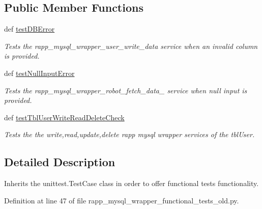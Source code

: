 \subsection*{Public Member Functions}
\begin{DoxyCompactItemize}
\item 
def \hyperlink{classrapp__mysql__wrapper__functional__tests__old_1_1TestDbWrapper_add745ad4016df457ef3687735e06e359}{test\-D\-B\-Error}
\begin{DoxyCompactList}\small\item\em Tests the rapp\-\_\-mysql\-\_\-wrapper\-\_\-user\-\_\-write\-\_\-data service when an invalid column is provided. \end{DoxyCompactList}\item 
def \hyperlink{classrapp__mysql__wrapper__functional__tests__old_1_1TestDbWrapper_a9a405cebcedd692d2ce15f37e6009737}{test\-Null\-Input\-Error}
\begin{DoxyCompactList}\small\item\em Tests the rapp\-\_\-mysql\-\_\-wrapper\-\_\-robot\-\_\-fetch\-\_\-data\-\_\- service when null input is provided. \end{DoxyCompactList}\item 
def \hyperlink{classrapp__mysql__wrapper__functional__tests__old_1_1TestDbWrapper_af9daea9a3c50a0f758f55235f4c26b03}{test\-Tbl\-User\-Write\-Read\-Delete\-Check}
\begin{DoxyCompactList}\small\item\em Tests the the write,read,update,delete rapp mysql wrapper services of the tbl\-User. \end{DoxyCompactList}\end{DoxyCompactItemize}


\subsection{Detailed Description}
Inherits the unittest.\-Test\-Case class in order to offer functional tests functionality. 

Definition at line 47 of file rapp\-\_\-mysql\-\_\-wrapper\-\_\-functional\-\_\-tests\-\_\-old.\-py.




